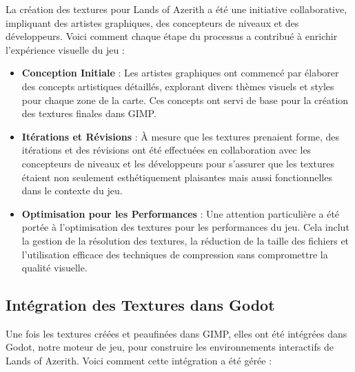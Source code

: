 La création des textures pour Lands of Azerith a été une initiative collaborative, impliquant des artistes graphiques, 
des concepteurs de niveaux et des développeurs. Voici comment chaque étape du processus a contribué à enrichir l'expérience visuelle du jeu :
\\

\begin{itemize}
    \item \textbf{Conception Initiale} : Les artistes graphiques ont commencé par élaborer des concepts artistiques détaillés, explorant divers thèmes visuels et styles pour chaque zone de la carte. Ces concepts ont servi de base pour la création des textures finales dans GIMP.
    \\

    \item \textbf{Itérations et Révisions} : À mesure que les textures prenaient forme, des itérations et des révisions ont été effectuées en collaboration avec les concepteurs de niveaux et les développeurs pour s'assurer que les textures étaient non seulement esthétiquement plaisantes mais aussi fonctionnelles dans le contexte du jeu.
    \\

    \item \textbf{Optimisation pour les Performances} : Une attention particulière a été portée à l'optimisation des textures pour les performances du jeu. Cela inclut la gestion de la résolution des textures, la réduction de la taille des fichiers et l'utilisation efficace des techniques de compression sans compromettre la qualité visuelle.
\end{itemize}

\subsection*{Intégration des Textures dans Godot}

Une fois les textures créées et peaufinées dans GIMP, elles ont été intégrées dans Godot, notre moteur de jeu,
 pour construire les environnements interactifs de Lands of Azerith. Voici comment cette intégration a été gérée :
\\

